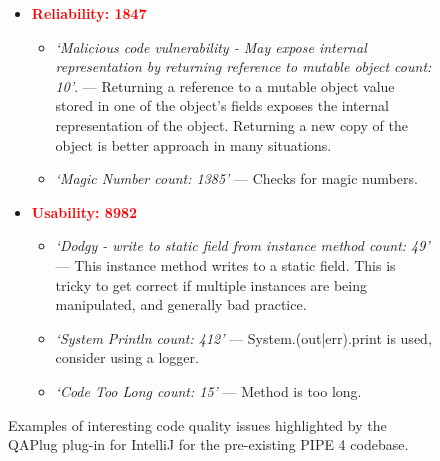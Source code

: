 \begin{figure}[tbp]
\begin{framed}
\begin{itemize}
    \item \textcolor{red}{\textbf{Reliability: 1847}}
    \begin{itemize}
        \item \textit{`Malicious code vulnerability - May expose internal representation by returning reference to mutable object count: 10'}. --- Returning a reference to a mutable object value stored in one of the object's fields exposes the internal representation of the object. Returning a new copy of the object is better approach in many situations.
        \item \textit{`Magic Number count: 1385'} --- Checks for magic numbers.
    \end{itemize}

    \item \textcolor{red}{\textbf{Usability: 8982}}
    \begin{itemize}
        \item \textit{`Dodgy - write to static field from instance method count: 49'} --- This instance method writes to a static field. This is tricky to get correct if multiple instances are being manipulated, and generally bad practice. 
        \item \textit{`System Println count: 412'} --- System.(out|err).print is used, consider using a logger.
        \item \textit{`Code Too Long count: 15'} --- Method is too long.

    \end{itemize}
\end{itemize} 
\end{framed}
\caption{Examples of interesting code quality issues highlighted by the QAPlug plug-in for IntelliJ for the pre-existing PIPE 4 codebase.}
\label{fig:qaplug}
\end{figure}
